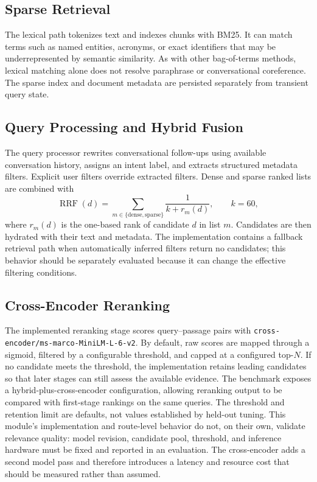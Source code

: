 \documentclass[conference]{IEEEtran}
\begin{document}
\subsection{Sparse Retrieval}
The lexical path tokenizes text and indexes chunks with BM25. It can match
terms such as named entities, acronyms, or exact identifiers that may be
underrepresented by semantic similarity. As with other bag-of-terms methods,
lexical matching alone does not resolve paraphrase or conversational
coreference. The sparse index and document metadata are persisted separately
from transient query state.

\subsection{Query Processing and Hybrid Fusion}
The query processor rewrites conversational follow-ups using available
conversation history, assigns an intent label, and extracts structured
metadata filters. Explicit user filters override extracted filters. Dense
and sparse ranked lists are combined with
\begin{equation}
  \operatorname{RRF}(d) =
  \sum_{m \in \{\mathrm{dense},\mathrm{sparse}\}}
  \frac{1}{k + r_m(d)}, \qquad k=60,
\end{equation}
where $r_m(d)$ is the one-based rank of candidate $d$ in list $m$.
Candidates are then hydrated with their text and metadata. The implementation
contains a fallback retrieval path when automatically inferred filters return
no candidates; this behavior should be separately evaluated because it can
change the effective filtering conditions.

\subsection{Cross-Encoder Reranking}
The implemented reranking stage scores query--passage pairs with
\texttt{cross-encoder/ms-marco-MiniLM-L-6-v2}. By default, raw scores are
mapped through a sigmoid, filtered by a configurable threshold, and capped at
a configured top-$N$. If no candidate meets the threshold, the implementation
retains leading candidates so that later stages can still assess the available
evidence. The benchmark exposes a hybrid-plus-cross-encoder configuration,
allowing reranking output to be compared with first-stage rankings on the same
queries. The threshold and retention limit are defaults, not values established
by held-out tuning. This module's implementation and route-level behavior do
not, on their own, validate relevance quality: model revision, candidate pool,
threshold, and inference hardware must be fixed and reported in an evaluation.
The cross-encoder adds a second model pass and therefore introduces a latency
and resource cost that should be measured rather than assumed.
\end{document}

